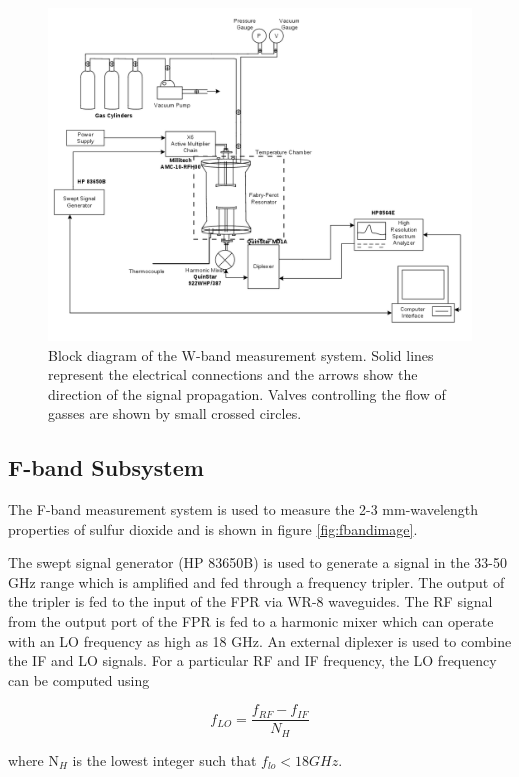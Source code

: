 \begin{figure}[H]
    \centering
	\includegraphics[width=1\textwidth]{./images/w-bandsystem.png}
	\caption{Block diagram of the W-band measurement system. Solid lines represent the electrical connections and the arrows show the direction of the signal propagation. Valves controlling the flow of gasses are shown by small crossed circles.}
    \label{fig:wbandimage}
\end{figure}


\subsection{F-band Subsystem}
The F-band measurement system is used to measure the 2-3 mm-wavelength properties of sulfur dioxide and is shown in figure \ref{fig:fbandimage}.

The swept signal generator (HP 83650B) is used to generate a signal in the 33-50 GHz range which
is amplified and fed through a frequency tripler. The output of the tripler is fed to the input of the FPR via WR-8 waveguides. The RF signal from the output port of the FPR is fed to a harmonic mixer which can operate with an LO frequency as high as 18 GHz. An external diplexer is used to combine the IF and LO signals. For a particular RF and IF frequency,  the LO frequency can be computed using

\begin{equation} \label{eq:fbandlo}
f_{LO} = \frac{f_{RF} - f_{IF}}{N_H	}
\end{equation}

\noindent where N$_H$ is the lowest integer such that $f_{lo} < 18 GHz$.

